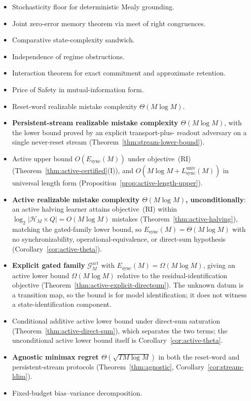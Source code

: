 \documentclass[12pt]{article}
\theoremstyle{definition}
\newcommand{\Lsyncu}{L_{\mathrm{sync}}^{\mathrm{univ}}}
\newcommand{\Esync}{E_{\mathrm{sync}}}
\newcommand{\Gact}{\mathcal G^{\mathrm{act}}}
\begin{document}
\begin{itemize}[leftmargin=1.6em]
\item Stochasticity floor for deterministic Mealy grounding.
\item Joint zero-error memory theorem via meet of right congruences.
\item Comparative state-complexity sandwich.
\item Independence of regime obstructions.
\item Interaction theorem for exact commitment and approximate retention.
\item Price of Safety in mutual-information form.
\item Reset-word realizable mistake complexity $\Theta(M\log M)$.
\item \textbf{Persistent-stream realizable mistake complexity
$\Theta(M\log M)$}, with the lower bound proved by an explicit transport-plus-
readout adversary on a single never-reset stream
(Theorem~\ref{thm:stream-lower-bound}).
\item Active upper bound $O(\Esync(M))$ under objective~(RI)
(Theorem~\ref{thm:active-certified}(I)), and
$O(M\log M+\Lsyncu(M))$ in universal length form
(Proposition~\ref{prop:active-length-upper}).
\item \textbf{Active realizable mistake complexity
$\Theta(M\log M)$, unconditionally}: an active halving learner attains
objective~(RI) within $\log_2|\mathcal H_M\times Q|=O(M\log M)$ mistakes
(Theorem~\ref{thm:active-halving}), matching the gated-family lower bound, so
$\Esync(M)=\Theta(M\log M)$ with no synchronizability,
operational-equivalence, or direct-sum hypothesis
(Corollary~\ref{cor:active-theta}).
\item \textbf{Explicit gated family} $\Gact_M$ with
$\Esync(M)=\Omega(M\log M)$, giving an active lower bound
$\Omega(M\log M)$ relative to the residual-identification objective
(Theorem~\ref{thm:active-explicit-directsum}).  The unknown datum is a
transition map, so the bound is for model identification; it does not witness a
state-identification component.
\item Conditional additive active lower bound under direct-sum saturation
(Theorem~\ref{thm:active-direct-sum}), which separates the two terms; the
unconditional active lower bound itself is
Corollary~\ref{cor:active-theta}.
\item \textbf{Agnostic minimax regret $\Theta(\sqrt{T M\log M})$} in both the
reset-word and persistent-stream protocols
(Theorem~\ref{thm:agnostic}, Corollary~\ref{cor:stream-ldim}).
\item Fixed-budget bias--variance decomposition.

\end{itemize}
\end{document}
